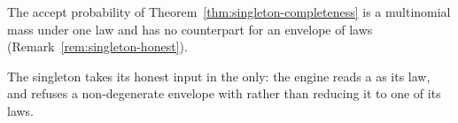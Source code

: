 
The accept probability of Theorem~\ref{thm:singleton-completeness} is a multinomial mass under
one law and has no counterpart for an envelope of laws
(Remark~\ref{rem:singleton-honest}).

\begin{requirement}\label{req:singleton-point-form}
The singleton takes its honest input in the  only: the
engine reads a  as its law, and refuses a
non-degenerate envelope with  rather
than reducing it to one of its laws.
\end{requirement}
